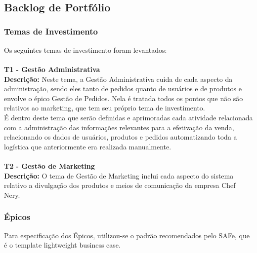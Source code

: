 \tab \\ \\ \\

\subsection{Backlog de Portfólio}


\subsubsection{Temas de Investimento}

Os seguintes temas de investimento foram levantados:\\
\tab \\
\textbf{T1 - Gestão Administrativa}
\tab \\
\textbf{Descrição:} Neste tema, a Gestão Administrativa cuida de cada aspecto da administração, sendo eles tanto de pedidos quanto de usuários e de produtos e envolve o épico Gestão de Pedidos. Nela é tratada todos os pontos que não são relativos ao marketing, que tem seu próprio tema de investimento. \\
\tab É dentro deste tema que serão definidas e aprimoradas cada atividade relacionada com a administração das informações relevantes para a efetivação da venda, relacionando os dados de usuários, produtos e pedidos automatizando toda a logística que anteriormente era realizada manualmente.\\

\tab \\
\textbf{T2 - Gestão de Marketing}
\tab \\
\textbf{Descrição:} O tema de Gestão de Marketing inclui cada aspecto do sistema relativo a divulgação dos produtos e meios de comunicação da empresa Chef Nery. \\

\subsubsection{Épicos}
Para especificação dos Épicos, utilizou-se o padrão recomendados pelo SAFe, que é o template lightweight business case.\\

\tab \\ \\ \\


